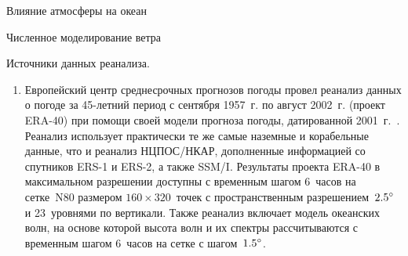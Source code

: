 \begin{chapter}{Влияние атмосферы на океан}
\begin{section}{Численное моделирование ветра}
\begin{paragraph}{Источники данных реанализа.}
\begin{enumerate}
\item
Европейский центр среднесрочных прогнозов погоды провел реанализ данных
о погоде за 45-летний период с сентября 1957~г. по август 2002~г. 
(проект ERA-40) при помощи своей модели прогноза погоды, датированной 
2001~г.~\cite{Uppala:2005}. Реанализ использует практически те же самые 
наземные и корабельные данные, что и реанализ НЦПОС/НКАР, дополненные 
информацией со спутников ERS-1 и ERS-2, а также SSM/I. Результаты проекта 
ERA-40 в максимальном разрешении доступны с временным шагом 6~часов на 
сетке~N80 размером $160 \times 320$~точек с пространственным 
разрешением~${2.5}^\circ$ и 23~уровнями по вертикали. Также реанализ 
включает модель океанских волн, на основе которой высота волн и их спектры 
рассчитываются с временным шагом 6~часов на сетке с шагом~${1.5}^\circ$.
%
%
\end{enumerate}
\end{paragraph}
\end{section}


\end{chapter}
